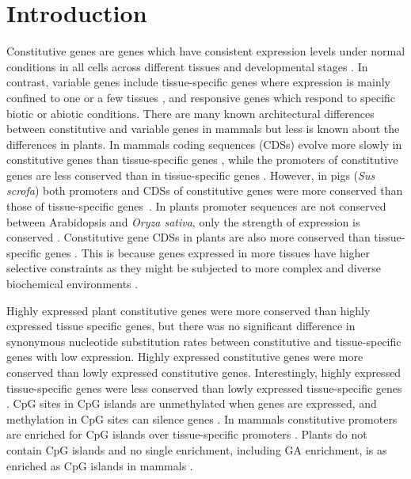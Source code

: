 \documentclass[../main.tex]{subfiles}
\begin{document}
\section{Introduction}
\label{chapter1:introduction}
Constitutive genes are genes which have consistent expression levels under normal conditions in all cells across different tissues and developmental stages \autocite{zhangMammalianHousekeepingGenes2004,butteFurtherDefiningHousekeeping2001}.
In contrast, variable genes include tissue-specific genes where expression is mainly confined to one or a few tissues \autocite{butteFurtherDefiningHousekeeping2001,schugPromoterFeaturesRelated2005}, and responsive genes which respond to specific biotic or abiotic conditions.
There are many known architectural differences between constitutive and variable genes in mammals but less is known about the differences in plants.
In mammals coding sequences (CDSs) evolve more slowly in constitutive genes than tissue\hyp{}specific genes \autocite{zhangMammalianHousekeepingGenes2004}, while the promoters of constitutive genes are less conserved than in tissue-specific genes \autocite{farreHousekeepingGenesTend2007,carninciGenomewideAnalysisMammalian2006}.
However, in pigs (\textit{Sus scrofa}) both promoters and CDSs of constitutive genes were more conserved than those of tissue-specific genes~\autocite{weiCharacterizationGenePromoters2019}.
In plants promoter sequences are not conserved between Arabidopsis and \textit{Oryza sativa}, only the strength of expression is conserved \autocite{armisenUniqueGenesPlants2008}.
Constitutive gene CDSs in plants are also more conserved than tissue-specific genes \autocite{armisenUniqueGenesPlants2008,wrightEffectsGeneExpression2004,mukhopadhyayDifferentialSelectiveConstraints2008}.
This is because genes expressed in more tissues have higher selective constraints \autocite{wrightEffectsGeneExpression2004} as they might be subjected to more complex and diverse biochemical environments \autocite{kumaFunctionalConstraintsVariations1995}.

Highly expressed plant constitutive genes were more conserved than highly expressed tissue specific genes, but there was no significant difference in synonymous nucleotide substitution rates between constitutive and tissue-specific genes with low expression.
Highly expressed constitutive genes were more conserved than lowly expressed constitutive genes.
Interestingly, highly expressed tissue-specific genes were less conserved than lowly expressed tissue-specific genes \autocite{mukhopadhyayDifferentialSelectiveConstraints2008}.
CpG sites in CpG islands are unmethylated when genes are expressed, and methylation in CpG sites can silence genes \autocite{birdDNAMethylationPatterns2002}.
In mammals constitutive promoters are enriched for CpG islands over tissue-specific promoters \autocite{carninciGenomewideAnalysisMammalian2006}.
Plants do not contain CpG islands \autocite{kapranovTranscriptionStartSite2009} and no single enrichment, including GA enrichment, is as enriched as CpG islands in mammals \autocite{megrawTranscriptionFactorAffinitybased2009}.
\end{document}
